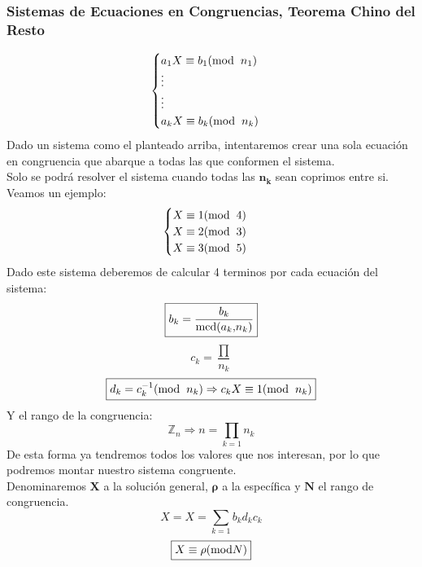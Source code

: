 \subsubsection{Sistemas de Ecuaciones en Congruencias, Teorema Chino del Resto}
\[
        \begin{cases}
                a_1X \equiv b_1(\textnormal{mod}\hspace{2mm}n_1)
                \\
                \vdots
                \\
                \vdots
                \\
                a_kX \equiv b_k(\textnormal{mod}\hspace{2mm}n_k)
        \end{cases}
\]
\noindent Dado un sistema como el planteado arriba, intentaremos crear una sola ecuación en congruencia que abarque a todas las que conformen el sistema.\\Solo se podrá resolver el sistema cuando todas las \(\mathbf{n_k}\) sean coprimos entre si.\\Veamos un ejemplo:
\[
        \begin{cases}
                X \equiv 1(\textnormal{mod}\hspace{2mm}4)
                \\
                X \equiv 2(\textnormal{mod}\hspace{2mm}3)
                \\
                X \equiv 3(\textnormal{mod}\hspace{2mm}5)
        \end{cases}
\]
\noindent Dado este sistema deberemos de calcular 4 terminos por cada ecuación del sistema:
\[
        \boxed{b_k = \frac{b_k}{\textnormal{mcd(}a_k\textnormal{,}n_k\textnormal{)}}}
\]
\[
        \boxed{c_k = \frac{\prod }{n_k}}
\]
\[
        \boxed{d_k = c_k^{-1} (\textnormal{mod}\hspace{2mm}n_k) \Rightarrow c_kX \equiv 1 (\textnormal{mod}\hspace{2mm}n_k)}
\]
\noindent Y el rango de la congruencia: \[
        \boxed{\mathbb{Z}_n \Rightarrow n = \prod_{k=1} n_k}
\]
\noindent De esta forma ya tendremos todos los valores que nos interesan, por lo que podremos montar nuestro sistema congruente.\\ Denominaremos \(\mathbf{X}\) a la solución general, \(\mathbf{\rho}\) a la específica y \(\mathbf{N}\) el rango de congruencia.
\[
        \boxed{X = X = \sum_{k=1} b_kd_kc_k}
\]
\[
        \boxed{X \equiv \rho (\textnormal{mod}N)}
\]
